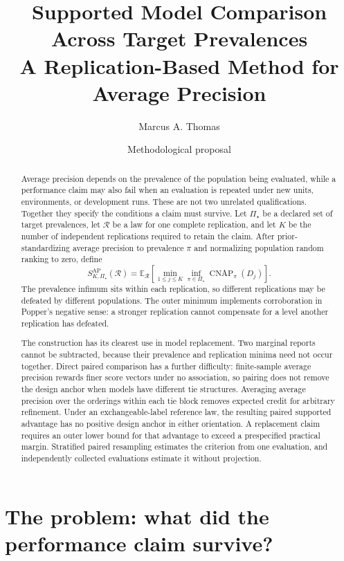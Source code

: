 \documentclass[11pt]{article}
\title{Supported Model Comparison Across Target Prevalences\\
\large A Replication-Based Method for Average Precision}
\author{Marcus A. Thomas}
\date{Methodological proposal}
\newcommand{\CNAP}{\operatorname{CNAP}}
\newcommand{\Regime}{\mathcal{R}}
\newcommand{\PSet}{\Pi_\star}
\newcommand{\E}{\mathbb{E}}
\theoremstyle{remark}
\begin{document}
\maketitle

\begin{abstract}
Average precision depends on the prevalence of the population being evaluated, while a performance claim may also fail when an evaluation is repeated under new units, environments, or development runs. These are not two unrelated qualifications. Together they specify the conditions a claim must survive. Let $\PSet$ be a declared set of target prevalences, let $\Regime$ be a law for one complete replication, and let $K$ be the number of independent replications required to retain the claim. After prior-standardizing average precision to prevalence $\pi$ and normalizing population random ranking to zero, define
\[
S_{K,\PSet}^{\mathrm{AP}}(\Regime)
=
\E_{\Regime}\left[
\min_{1\leq j\leq K}
\inf_{\pi\in\PSet}\CNAP_\pi(D_j)
\right].
\]
The prevalence infimum sits within each replication, so different replications may be defeated by different populations. The outer minimum implements corroboration in Popper's negative sense: a stronger replication cannot compensate for a level another replication has defeated.

The construction has its clearest use in model replacement. Two marginal reports cannot be subtracted, because their prevalence and replication minima need not occur together. Direct paired comparison has a further difficulty: finite-sample average precision rewards finer score vectors under no association, so pairing does not remove the design anchor when models have different tie structures. Averaging average precision over the orderings within each tie block removes expected credit for arbitrary refinement. Under an exchangeable-label reference law, the resulting paired supported advantage has no positive design anchor in either orientation. A replacement claim requires an outer lower bound for that advantage to exceed a prespecified practical margin. Stratified paired resampling estimates the criterion from one evaluation, and independently collected evaluations estimate it without projection.
\end{abstract}

\section{The problem: what did the performance claim survive?}
\label{sec:introduction}
\end{document}
